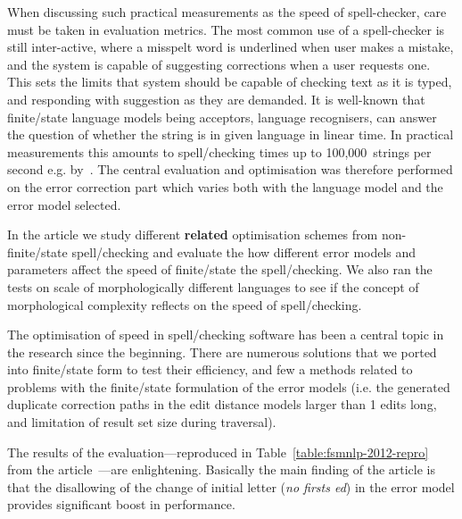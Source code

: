 \documentclass[officiallayout]{unihelcompling}
\begin{document}
When discussing such practical measurements as the speed of spell-checker, care
must be taken in evaluation metrics. The most common use of a spell-checker is
still inter-active, where a misspelt word is underlined when user makes a
mistake, and the system is capable of suggesting corrections when a user
requests one. This sets the limits that system should be capable of checking
text as it is typed, and responding with suggestion as they are demanded. It is
well-known that finite\-/state language models being acceptors,
language recognisers, can answer the question of whether the string is in given
language in linear time. In practical measurements this amounts to
spell\-/checking times up to 100,000~strings per second e.g.
by~\citet{silfverberg2009hfst}. The central evaluation and optimisation was
therefore performed on the error correction part which varies both with the
language model and the error model selected.

In the article we study different \textbf{related} optimisation schemes from
non-finite\-/state spell\-/checking and evaluate the how different error models and
parameters affect the speed of finite\-/state the spell\-/checking. We also ran the
tests on scale of morphologically different languages to see if the concept of
morphological complexity reflects on the speed of spell\-/checking.

The optimisation of speed in spell\-/checking software has been a central
topic in the research since the beginning. There are numerous solutions that we
ported into finite\-/state form to test their efficiency, and few a methods
related to problems with the finite\-/state formulation of the error models (i.e.
the generated duplicate correction paths in the edit distance models larger
than 1 edits long, and limitation of result set size during traversal).

The results of the evaluation---reproduced in
Table~\ref{table:fsmnlp-2012-repro} from the
article~---are enlightening. Basically the main
finding of the article is that the disallowing of the change of initial letter
(\emph{no firsts ed}) in the error model provides significant boost in
performance.
\end{document}
